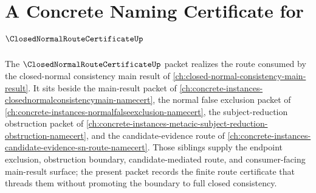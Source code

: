 \chapter{A Concrete Naming Certificate for $\ClosedNormalRouteCertificateUp$}
\label{ch:concrete-instances-closed-normal-route-certificate-namecert}

The $\ClosedNormalRouteCertificateUp$ packet realizes the route consumed by the closed-normal consistency main result of \autoref{ch:closed-normal-consistency-main-result}. It sits beside the main-result packet of \autoref{ch:concrete-instances-closednormalconsistencymain-namecert}, the normal false exclusion packet of \autoref{ch:concrete-instances-normalfalseexclusion-namecert}, the subject-reduction obstruction packet of \autoref{ch:concrete-instances-metacic-subject-reduction-obstruction-namecert}, and the candidate-evidence route of \autoref{ch:concrete-instances-candidate-evidence-sn-route-namecert}. Those siblings supply the endpoint exclusion, obstruction boundary, candidate-mediated route, and consumer-facing main-result surface; the present packet records the finite route certificate that threads them without promoting the boundary to full closed consistency.

